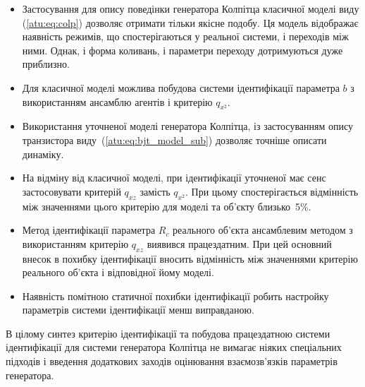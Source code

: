 \begin{itemize}

  \item
    Застосування для опису поведінки генератора Колпітца
    класичної моделі виду (\ref{atu:eq:colp}) дозволяє отримати тільки
    якісне подобу. Ця модель відображає наявність режимів, що
    спостерігаються у реальної системи, і переходів між ними. Однак,
    і форма коливань, і параметри переходу дотримуються дуже
    приблизно.

  \item
    Для класичної моделі можлива побудова системи ідентифікації
    параметра
    $b$ з використанням ансамблю агентів і критерію
    $ q_{x^2} $.

  \item
    Використання уточненої моделі генератора Колпітца, із
    застосуванням опису транзистора виду~(\ref{atu:eq:bjt_model_sub}) дозволяє
    точніше описати динаміку.

  \item
    На відміну від класичної моделі, при ідентифікації уточненої
    має сенс застосовувати критерій
    $ q_{xz} $ замість
    $ q_{x^2} $. При цьому спостерігається відмінність між значеннями
    цього критерію для моделі та об'єкту близько~5\%.

  \item
    Метод ідентифікації параметра
    $ R_c $ реального об'єкта ансамблевим методом з використанням
    критерію
    $ q_{xz} $ виявився працездатним. При цей основний внесок в похибку
    ідентифікації вносить відмінність між значеннями критерію
    реального об'єкта і відповідної йому моделі.

  \item
    Наявність помітною статичної похибки ідентифікації робить
    настройку параметрів системи ідентифікації менш виправданою.

\end{itemize}


В цілому синтез критерію ідентифікації та побудова працездатною
системи ідентифікації для системи генератора Колпітца
не вимагає ніяких спеціальних підходів і введення
додаткових заходів оцінювання взаємозв'язків параметрів
генератора.


